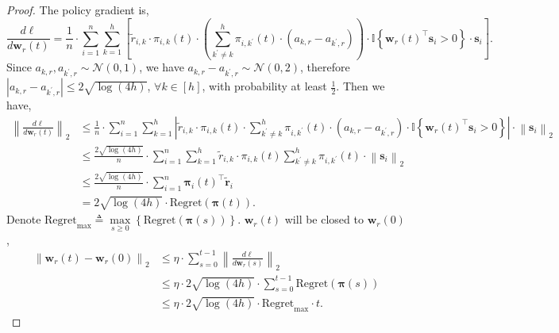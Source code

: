 \documentclass[10pt]{article}
\def\rvs{{\mathbf{s}}}
\def\rvw{{\mathbf{w}}}
\def\rvtilder{{\tilde{\mathbf{r}}}}
\def\regret{{\text{Regret}}}
\def\rvpi{{\boldsymbol{\pi}}}
\def\sI{{\mathbb{I}}}
\def\gN{{\mathcal{N}}}
\begin{document}
\begin{proof}
The policy gradient is,
\begin{equation*}
	\frac{d\ell}{d \rvw_r(t)} = \frac{1}{n} \cdot \sum\limits_{i=1}^{n}{ \sum\limits_{k=1}^{h}{ \left[ \tilde{r}_{i,k} \cdot \pi_{i,k}(t) \cdot \left( \sum\limits_{k^\prime \not= k}^{h}{ \pi_{i,k^\prime}(t) \cdot \left( a_{k,r} - a_{k^\prime,r} \right)  } \right) \cdot \sI\left\{ \rvw_r(t)^\top \rvs_i > 0 \right\} \cdot \rvs_i \right] } }.
\end{equation*}
Since $a_{k,r}, a_{k^\prime,r} \sim \gN(0, 1)$, we have $a_{k,r} - a_{k^\prime,r} \sim \gN(0, 2)$, therefore $\left| a_{k,r} - a_{k^\prime,r} \right| \le 2 \sqrt{\log{\left(4h\right)}}$, $\forall k \in [h]$, with  probability at least $\frac{1}{2} $. Then we have,
\begin{equation*}
\begin{split}
	\left\| \frac{d\ell}{d \rvw_r(t)} \right\|_2 &\le \frac{1}{n} \cdot \sum\limits_{i=1}^{n}{ \sum\limits_{k=1}^{h}{ \left| \tilde{r}_{i,k} \cdot \pi_{i,k}(t) \cdot \sum\limits_{k^\prime \not= k}^{h}{ \pi_{i,k^\prime}(t) \cdot \left( a_{k,r} - a_{k^\prime,r} \right)  } \cdot \sI\left\{ \rvw_r(t)^\top \rvs_i > 0 \right\} \right| \cdot \left\| \rvs_i \right\|_2 }} \\
	&\le \frac{2 \sqrt{\log{\left(4h\right)}}}{n} \cdot \sum\limits_{i=1}^{n}{ \sum\limits_{k=1}^{h}{ \tilde{r}_{i,k} \cdot \pi_{i,k}(t) \sum\limits_{k^\prime \not= k}^{h}{ \pi_{i,k^\prime}(t)  } \cdot \left\| \rvs_i \right\|_2  }} \\
	&\le \frac{2 \sqrt{\log{\left(4h\right)}}}{n} \cdot \sum\limits_{i=1}^{n}{ \rvpi_{i}(t)^\top \rvtilder_i } \\
	&= 2 \sqrt{\log{\left(4h\right)}} \cdot \regret(\rvpi(t)).
\end{split}
\end{equation*}
Denote $\regret_{\max} \triangleq \max\limits_{s \ge 0}\left\{\regret\left( \rvpi(s) \right)\right\}$. $\rvw_r(t)$ will be closed to $\rvw_r(0)$,
\begin{equation*}
\begin{split}
	\left\| \rvw_r(t) - \rvw_r(0) \right\|_2 &\le \eta \cdot \sum\limits_{s=0}^{t-1}{\left\| \frac{d\ell}{d \rvw_r(s)} \right\|_2} \\
	&\le \eta \cdot 2 \sqrt{\log{\left(4h\right)}} \cdot \sum\limits_{s=0}^{t-1}{ \regret(\rvpi(s)) } \\
	&\le \eta \cdot 2 \sqrt{\log{\left(4h\right)}} \cdot \regret_{\max} \cdot t .
\end{split}

\end{equation*}
\end{proof}
\end{document}
